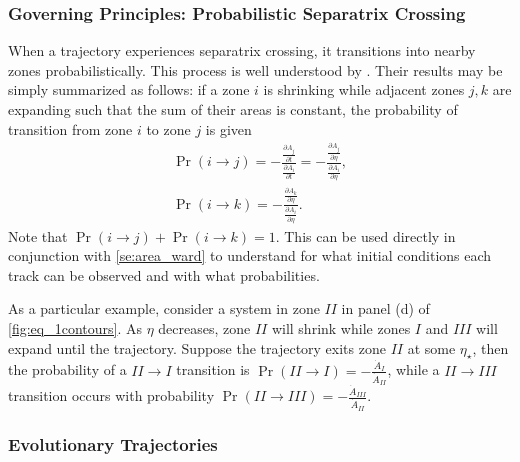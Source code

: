 \documentclass[
        fleqn,
        usenatbib,
    ]{mnras}
\newcommand*{\pd}[2]{\frac{\partial#1}{\partial#2}}
\newcommand*{\p}[1]{\left(#1\right)}
\begin{document}
\subsubsection{Governing Principles: Probabilistic Separatrix Crossing}

When a trajectory experiences separatrix crossing, it transitions into nearby
zones probabilistically. This process is well understood by
\citealp{henrard1982,henrard1987}. Their results may be simply summarized as
follows: if a zone $i$ is shrinking while adjacent zones $j, k$ are expanding
such that the sum of their areas is constant, the probability of transition from
zone $i$ to zone $j$ is given
\begin{align}
    \Pr\p{i \to j} = -\frac{\pd{A_j}{t}}{ \pd{A_i}{t}}
        = -\frac{\pd{A_j}{\eta}}{ \pd{A_i}{\eta}},\\
    \Pr\p{i \to k}
        = -\frac{\pd{A_k}{\eta}}{ \pd{A_i}{\eta}}.\label{eq:henrard_hop}
\end{align}
Note that $\Pr \p{i \to j} + \Pr\p{i \to k} = 1$. This can be used directly in
conjunction with \autoref{se:area_ward} to understand for what initial
conditions each track can be observed and with what probabilities.

As a particular example, consider a system in zone $II$ in panel (d) of
\autoref{fig:eq_1contours}. As $\eta$ decreases, zone $II$ will shrink while
zones $I$ and $III$ will expand until the trajectory. Suppose the trajectory
exits zone $II$ at some $\eta_\star$, then the probability of a $II \to I$
transition is $\Pr\p{II \to I} = -\frac{\dot{A}_{I}}{\dot{A}_{II}}$, while a $II
\to III$ transition occurs with probability $\Pr\p{II \to III} =
-\frac{\dot{A}_{III}}{\dot{A}_{II}}$.

\subsubsection{Evolutionary Trajectories}\label{sss:evol_traj}
\end{document}
